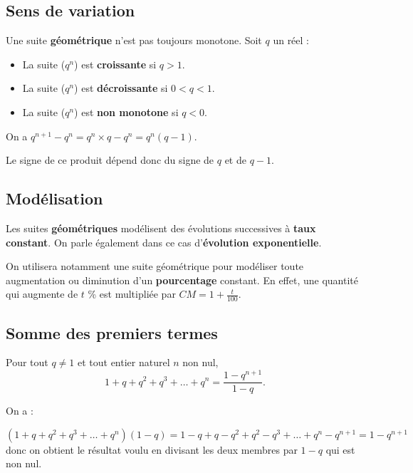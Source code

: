 \documentclass[a4paper,11pt]{article}
\begin{document}
\subsection{Sens de variation}

\begin{cprop}
Une suite \textbf{géométrique} n'est pas toujours monotone. Soit $q$ un réel :
\begin{itemize}
	\item La suite ($q^n$) est \textbf{croissante} si $q>1$.
	\item La suite ($q^n$) est \textbf{décroissante} si $0<q<1$.
	\item La suite ($q^n$) est \textbf{non monotone} si $q<0$.
\end{itemize}
\end{cprop}

\begin{cdemo}
On a $q^{n+1} -q^{n} = q^{n} \times q - q^{n}=q^{n} (q-1)$.

Le signe de ce produit dépend donc du signe de $q$ et de $q-1$.
\end{cdemo}

\subsection{Modélisation}

\begin{cprop}
Les suites \textbf{géométriques} modélisent des évolutions successives à \textbf{taux constant}. On parle également dans ce cas d'\textbf{évolution exponentielle}.
\end{cprop}

\begin{crmq}
On utilisera notamment une suite géométrique pour modéliser toute augmentation ou diminution d'un \textbf{pourcentage} constant. En effet, une quantité qui augmente de $t$ \% est multipliée par $CM=1+\frac{t}{100}$.
\end{crmq}

\subsection{Somme des premiers termes}

\begin{cthm}
Pour tout $q \neq 1$ et tout entier naturel $n$ non nul, \[1+q+q^2+q^3+ \dots + q^n=\frac{1-q^{n+1}}{1-q}.\]
\end{cthm}

\begin{cdemo}
On a :

$(1+q+q^2+q^3+ \dots + q^n)(1-q)=1-q+q-q^2+q^2-q^3+\dots+q^n-q^{n+1}=1-q^{n+1} $ donc on obtient le résultat voulu en divisant les deux membres par $1-q$ qui est non nul.
\end{cdemo}
\end{document}
